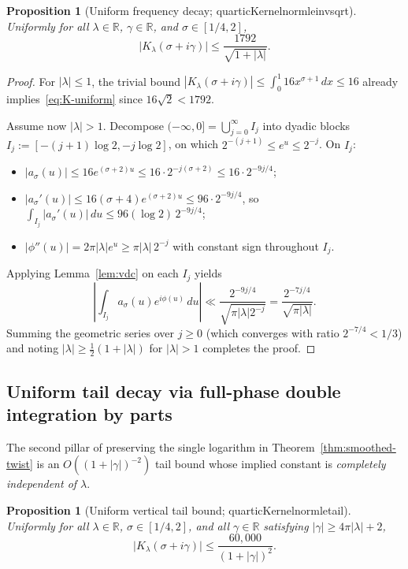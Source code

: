 \documentclass[11pt,reqno]{amsart}
\numberwithin{equation}{section}
\newtheorem{proposition}[theorem]{Proposition}
\theoremstyle{definition}
\newcommand{\R}{\mathbb{R}}
\newcommand{\1}{\mathbf{1}}
\newcommand{\lean}[1]{{\footnotesize\ttfamily\renewcommand{\_}{\textunderscore\allowbreak}#1}}
\begin{document}
\begin{proposition}[Uniform frequency decay; \lean{quarticKernel\_norm\_le\_inv\_sqrt}]
\label{prop:K-uniform}
Uniformly for all $\lambda \in \R$, $\gamma \in \R$, and $\sigma \in [1/4, 2]$,
\begin{equation}\label{eq:K-uniform}
  \bigl|K_\lambda(\sigma + i\gamma)\bigr| \le \frac{1792}{\sqrt{1 + |\lambda|}}.
\end{equation}
\end{proposition}

\begin{proof}
For $|\lambda| \le 1$, the trivial bound $|K_\lambda(\sigma+i\gamma)| \le \int_0^1 16 x^{\sigma+1}\,dx \le 16$ already implies~\eqref{eq:K-uniform} since $16\sqrt{2} < 1792$.

Assume now $|\lambda| > 1$. Decompose $(-\infty, 0] = \bigcup_{j=0}^\infty I_j$ into dyadic blocks $I_j := [-(j+1)\log 2, -j\log 2]$, on which $2^{-(j+1)} \le e^u \le 2^{-j}$. On $I_j$:
\begin{itemize}
  \item $|a_\sigma(u)| \le 16 e^{(\sigma+2)u} \le 16 \cdot 2^{-j(\sigma+2)} \le 16 \cdot 2^{-9j/4}$;
  \item $|a_\sigma'(u)| \le 16(\sigma + 4)e^{(\sigma+2)u} \le 96 \cdot 2^{-9j/4}$, so $\int_{I_j} |a_\sigma'(u)|\,du \le 96 (\log 2)\, 2^{-9j/4}$;
  \item $|\phi''(u)| = 2\pi|\lambda| e^u \ge \pi |\lambda|\, 2^{-j}$ with constant sign throughout $I_j$.
\end{itemize}
Applying Lemma~\ref{lem:vdc} on each $I_j$ yields
\[
  \left|\int_{I_j} a_\sigma(u) e^{i\phi(u)}\,du\right|
  \ll \frac{2^{-9j/4}}{\sqrt{\pi |\lambda| 2^{-j}}}
  = \frac{2^{-7j/4}}{\sqrt{\pi |\lambda|}}.
\]
Summing the geometric series over $j \ge 0$ (which converges with ratio $2^{-7/4} < 1/3$) and noting $|\lambda| \ge \frac{1}{2}(1 + |\lambda|)$ for $|\lambda| > 1$ completes the proof.
\end{proof}

\subsection{Uniform tail decay via full-phase double integration by parts}

The second pillar of preserving the single logarithm in Theorem~\ref{thm:smoothed-twist} is an $O((1+|\gamma|)^{-2})$ tail bound whose implied constant is \emph{completely independent of $\lambda$}.

\begin{proposition}[Uniform vertical tail bound; \lean{quarticKernel\_norm\_le\_tail}]
\label{prop:K-tail}
Uniformly for all $\lambda \in \R$, $\sigma \in [1/4, 2]$, and all $\gamma \in \R$ satisfying $|\gamma| \ge 4\pi|\lambda| + 2$,
\begin{equation}\label{eq:K-tail}
  \bigl|K_\lambda(\sigma + i\gamma)\bigr| \le \frac{60{,}000}{(1 + |\gamma|)^2}.
\end{equation}
\end{proposition}
\end{document}
